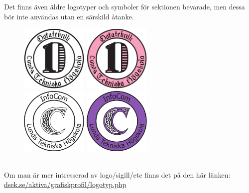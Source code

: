 \documentclass[]{dsekprotokoll}
\begin{document}
Det finns även äldre logotyper och symboler för sektionen bevarade, men dessa bör inte användas utan en särskild åtanke.
\begin{figure}[!hbp]
    \centering
    \includegraphics[height=32mm]{D-logo-program-bw.pdf} \includegraphics[height=32mm]{D-logo-program-col.pdf} \\
    \includegraphics[height=32mm]{C-logo-org-bw.pdf} \includegraphics[height=32mm]{C-logo-org-col.pdf}
    \label{fig:my_label}
\end{figure}
\\
Om man är mer intresserad av logo/sigill/etc finns det på den här länken: \\
\href{https://www.dsek.se/aktiva/grafiskprofil/logotyp.php}{dsek.se/aktiva/grafiskprofil/logotyp.php}


\end{document}
